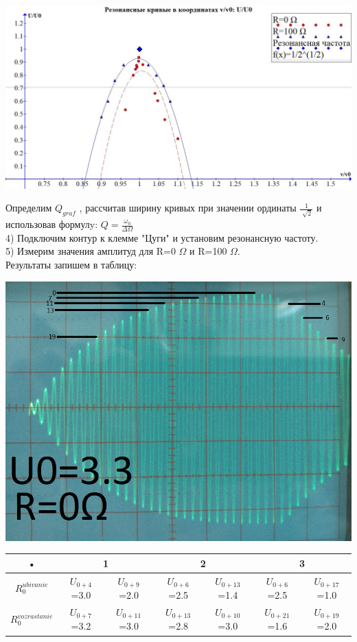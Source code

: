 \documentclass[a4paper,12pt]{article} %
\begin{document}
\begin{flushleft}
\includegraphics[scale=0.35]{3251}\\
\end{flushleft}        
 Определим  $Q_{graf}$ , рассчитав ширину кривых при значении ординаты  $\frac{1}{\sqrt[ ]{2}}$ и использовав формулy: $Q=\frac{\omega_0}{\Delta\Omega}$ \\
 
4) Подключим контур к клемме "Цуги" и установим резонансную частоту.\\
5) Измерим значения амплитуд для R=0 $\Omega$ и R=100 $\Omega$.\\
Результаты запишем в таблицу:

\includegraphics[scale=0.6]{r100}\\

\begin{tabular}{|c|c|c|c|c|c|c|}
\hline 
• &\multicolumn{2}{|c|}{1} & \multicolumn{2}{|c|}{2} & \multicolumn{2}{|c|}{3} \\ 
\hline 
$R_0^{ubivanie}$ &$U_{0+4}$=3.0 & $U_{0+9}$=2.0 & $U_{0+6}$=2.5 & $U_{0+13}$=1.4 & $U_{0+6}$=2.5 & $U_{0+17}$=1.0 \\ 
\hline 
$R_0^{vozrastanie}$ &$U_{0+7}$=3.2 & $U_{0+11}$=3.0 & $U_{0+13}$=2.8 & $U_{0+10}$=3.0 & $U_{0+21}$=1.6 & $U_{0+19}$=2.0 \\ 
\hline 

\end{tabular} 
\end{document}
